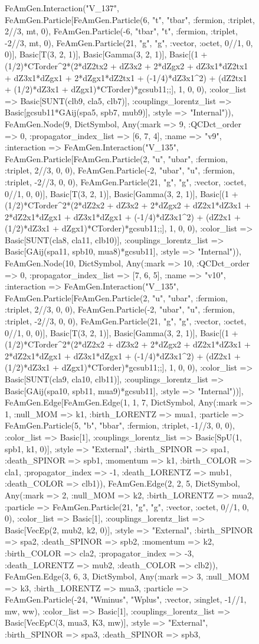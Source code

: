 \documentclass{revtex4}
\begin{document}
\begin{figure}[!htb]
\begin{center}
{FeAmGen.Interaction("V_137", FeAmGen.Particle[FeAmGen.Particle(6, "t", "tbar", :fermion, :triplet, 2//3, mt, 0), FeAmGen.Particle(-6, "tbar", "t", :fermion, :triplet, -2//3, mt, 0), FeAmGen.Particle(21, "g", "g", :vector, :octet, 0//1, 0, 0)], Basic[T(3, 2, 1)], Basic[Gamma(3, 2, 1)], Basic[(1 + (1/2)*CTorder^2*(2*dZ2tx2 + dZ3x2 + 2*dZgx2 + dZ3x1*dZ2tx1 + dZ3x1*dZgx1 + 2*dZgx1*dZ2tx1 + (-1/4)*dZ3x1^2) + (dZ2tx1 + (1/2)*dZ3x1 + dZgx1)*CTorder)*gcsub11;;], 1, 0, 0), :color_list => Basic[SUNT(clb9, cla5, clb7)], :couplings_lorentz_list => Basic[gcsub11*GAij(spa5, spb7, mub9)], :style => "Internal")), FeAmGen.Node(9, Dict{Symbol, Any}(:mark => 9, :QCDct_order => 0, :propagator_index_list => [6, 7, 4], :name => "v9", :interaction => FeAmGen.Interaction("V_135", FeAmGen.Particle[FeAmGen.Particle(2, "u", "ubar", :fermion, :triplet, 2//3, 0, 0), FeAmGen.Particle(-2, "ubar", "u", :fermion, :triplet, -2//3, 0, 0), FeAmGen.Particle(21, "g", "g", :vector, :octet, 0//1, 0, 0)], Basic[T(3, 2, 1)], Basic[Gamma(3, 2, 1)], Basic[(1 + (1/2)*CTorder^2*(2*dZ2x2 + dZ3x2 + 2*dZgx2 + dZ2x1*dZ3x1 + 2*dZ2x1*dZgx1 + dZ3x1*dZgx1 + (-1/4)*dZ3x1^2) + (dZ2x1 + (1/2)*dZ3x1 + dZgx1)*CTorder)*gcsub11;;], 1, 0, 0), :color_list => Basic[SUNT(cla8, cla11, clb10)], :couplings_lorentz_list => Basic[GAij(spa11, spb10, mua8)*gcsub11], :style => "Internal")), FeAmGen.Node(10, Dict{Symbol, Any}(:mark => 10, :QCDct_order => 0, :propagator_index_list => [7, 6, 5], :name => "v10", :interaction => FeAmGen.Interaction("V_135", FeAmGen.Particle[FeAmGen.Particle(2, "u", "ubar", :fermion, :triplet, 2//3, 0, 0), FeAmGen.Particle(-2, "ubar", "u", :fermion, :triplet, -2//3, 0, 0), FeAmGen.Particle(21, "g", "g", :vector, :octet, 0//1, 0, 0)], Basic[T(3, 2, 1)], Basic[Gamma(3, 2, 1)], Basic[(1 + (1/2)*CTorder^2*(2*dZ2x2 + dZ3x2 + 2*dZgx2 + dZ2x1*dZ3x1 + 2*dZ2x1*dZgx1 + dZ3x1*dZgx1 + (-1/4)*dZ3x1^2) + (dZ2x1 + (1/2)*dZ3x1 + dZgx1)*CTorder)*gcsub11;;], 1, 0, 0), :color_list => Basic[SUNT(cla9, cla10, clb11)], :couplings_lorentz_list => Basic[GAij(spa10, spb11, mua9)*gcsub11], :style => "Internal"))], FeAmGen.Edge[FeAmGen.Edge(1, 1, 7, Dict{Symbol, Any}(:mark => 1, :null_MOM => k1, :birth_LORENTZ => mua1, :particle => FeAmGen.Particle(5, "b", "bbar", :fermion, :triplet, -1//3, 0, 0), :color_list => Basic[1], :couplings_lorentz_list => Basic[SpU(1, spb1, k1, 0)], :style => "External", :birth_SPINOR => spa1, :death_SPINOR => spb1, :momentum => k1, :birth_COLOR => cla1, :propagator_index => -1, :death_LORENTZ => mub1, :death_COLOR => clb1)), FeAmGen.Edge(2, 2, 5, Dict{Symbol, Any}(:mark => 2, :null_MOM => k2, :birth_LORENTZ => mua2, :particle => FeAmGen.Particle(21, "g", "g", :vector, :octet, 0//1, 0, 0), :color_list => Basic[1], :couplings_lorentz_list => Basic[VecEp(2, mub2, k2, 0)], :style => "External", :birth_SPINOR => spa2, :death_SPINOR => spb2, :momentum => k2, :birth_COLOR => cla2, :propagator_index => -3, :death_LORENTZ => mub2, :death_COLOR => clb2)), FeAmGen.Edge(3, 6, 3, Dict{Symbol, Any}(:mark => 3, :null_MOM => k3, :birth_LORENTZ => mua3, :particle => FeAmGen.Particle(-24, "Wminus", "Wplus", :vector, :singlet, -1//1, mw, ww), :color_list => Basic[1], :couplings_lorentz_list => Basic[VecEpC(3, mua3, K3, mw)], :style => "External", :birth_SPINOR => spa3, :death_SPINOR => spb3, }
\end{center}
\end{figure}
\end{document}

